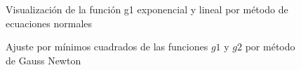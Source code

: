 \documentclass{endm}
\begin{document}
\begin{figure}%
    \centering
    \qquad
    \caption{Visualización de la función g1 exponencial y lineal por método de ecuaciones normales}%
    \label{fig:example}%
\end{figure}
\begin{figure}%
    \centering
    \qquad
    \caption{Ajuste por mínimos cuadrados de las funciones $g1$ y $g2$ por método de Gauss Newton}%
    \label{fig:example}%
\end{figure}
\end{document}
